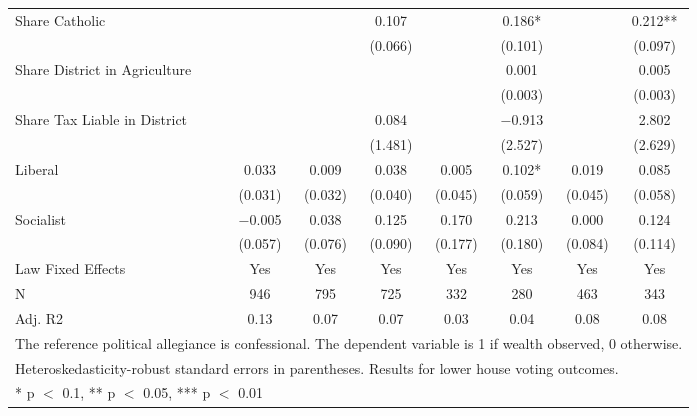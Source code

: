 \begin{table}[!h]
{\begin{tabular}[t]{lccccccc}
Share Catholic &  &  & \num{0.107} &  & \num{0.186}* &  & \num{0.212}**\\
 &  &  & (\num{0.066}) &  & (\num{0.101}) &  & (\num{0.097})\\
Share District in Agriculture &  &  &  &  & \num{0.001} &  & \num{0.005}\\
 &  &  &  &  & (\num{0.003}) &  & (\num{0.003})\\
Share Tax Liable in District &  &  & \num{0.084} &  & \num{-0.913} &  & \num{2.802}\\
 &  &  & (\num{1.481}) &  & (\num{2.527}) &  & (\num{2.629})\\
Liberal & \num{0.033} & \num{0.009} & \num{0.038} & \num{0.005} & \num{0.102}* & \num{0.019} & \num{0.085}\\
 & (\num{0.031}) & (\num{0.032}) & (\num{0.040}) & (\num{0.045}) & (\num{0.059}) & (\num{0.045}) & (\num{0.058})\\
Socialist & \num{-0.005} & \num{0.038} & \num{0.125} & \num{0.170} & \num{0.213} & \num{0.000} & \num{0.124}\\
 & (\num{0.057}) & (\num{0.076}) & (\num{0.090}) & (\num{0.177}) & (\num{0.180}) & (\num{0.084}) & (\num{0.114})\\
\midrule
Law Fixed Effects & Yes & Yes & Yes & Yes & Yes & Yes & Yes\\
N & \num{946} & \num{795} & \num{725} & \num{332} & \num{280} & \num{463} & \num{343}\\
Adj. R2 & \num{0.13} & \num{0.07} & \num{0.07} & \num{0.03} & \num{0.04} & \num{0.08} & \num{0.08}\\
\bottomrule
\multicolumn{8}{l}{\rule{0pt}{1em}The reference political allegiance is confessional. The dependent variable is 1 if wealth observed, 0 otherwise.}\\
\multicolumn{8}{l}{\rule{0pt}{1em}Heteroskedasticity-robust standard errors in parentheses. Results for lower house voting outcomes.}\\
\multicolumn{8}{l}{\rule{0pt}{1em}* p $<$ 0.1, ** p $<$ 0.05, *** p $<$ 0.01}\\
\end{tabular}}
\end{table}
